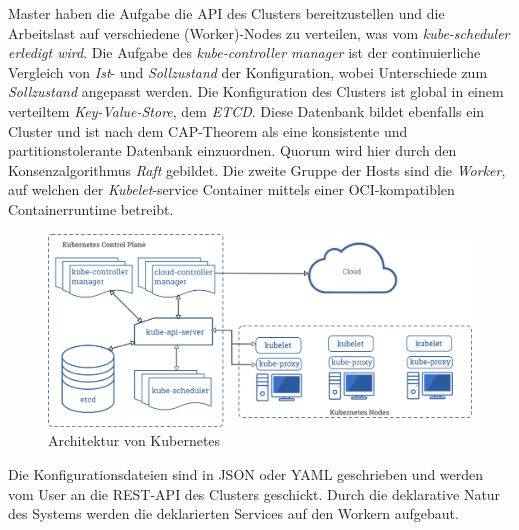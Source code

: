 \documentclass[a4paper,11pt]{article}
\begin{document}
      Master haben die Aufgabe die API des Clusters bereitzustellen und die Arbeitslast auf verschiedene (Worker)-Nodes zu verteilen, was vom 
      \emph{kube-scheduler erledigt wird}. Die Aufgabe des \emph{kube-controller manager} ist der continuierliche Vergleich von \emph{Ist}- und 
      \emph{Sollzustand} der Konfiguration, wobei Unterschiede zum \emph{Sollzustand} angepasst werden. Die Konfiguration des Clusters ist 
      global in einem verteiltem \emph{Key-Value-Store}, dem \emph{ETCD}. Diese Datenbank bildet ebenfalls ein Cluster und ist nach dem CAP-Theorem
      als eine konsistente und partitionstolerante Datenbank einzuordnen. Quorum wird hier durch den Konsenzalgorithmus \emph{Raft} gebildet.
      Die zweite Gruppe der Hosts sind die \emph{Worker}, auf welchen der \emph{Kubelet}-service Container mittels einer OCI-kompatiblen Containerruntime
      betreibt.
      \begin{figure}[!ht]
        \includegraphics[width=\linewidth]{assets/components-of-kubernetes.png}
        \caption{Architektur von Kubernetes}
        \label{fig:kubernetes_arch}
      \end{figure}
      Die Konfigurationsdateien sind in JSON oder YAML geschrieben und werden vom User an die REST-API des Clusters geschickt. Durch die deklarative Natur des Systems
      werden die deklarierten Services auf den Workern aufgebaut.
\end{document}
